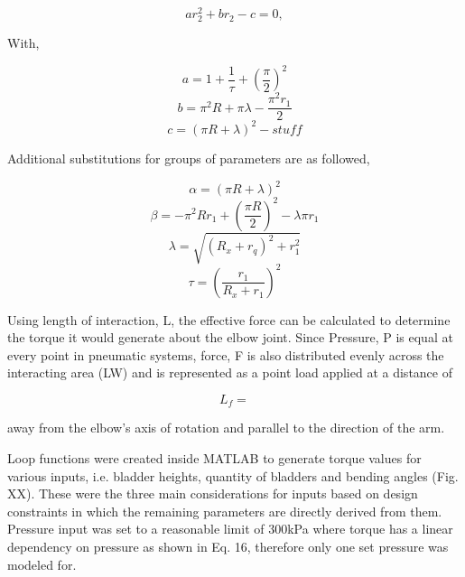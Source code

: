 \documentclass[letterpaper, 10 pt, conference]{ieeeconf}  %
\begin{document}
\begin{equation}\label{eq. X7}
	ar_2^2+br_2-c = 0,
\end{equation}

With,

\begin{equation}\label{eq. X8}
	a = 1+\frac{1}{\tau}+(\frac{\pi}{2})^2
\end{equation}
\begin{equation}\label{eq. X9}
	b = \pi^2R+\pi\lambda-\frac{\pi^2r_1}{2}
\end{equation}
\begin{equation}\label{eq. X10}
	c = (\pi R+\lambda)^2- stuff
\end{equation}

Additional substitutions for groups of parameters are as followed,

\begin{equation}\label{eq. X11}
	\alpha = (\pi R+\lambda)^2
\end{equation}
\begin{equation}\label{eq. X12}
	\beta = -\pi^2Rr_1+(\frac{\pi R}{2})^2-\lambda\pi r_1
\end{equation}
\begin{equation}\label{eq. X13}
	\lambda = \sqrt{(R_x+r_q)^2+r_1^2}
\end{equation}
\begin{equation}\label{eq. X14}
	\tau = (\frac{r_1}{R_x+r_1})^2
\end{equation}

Using length of interaction, L, the effective force can be calculated to determine the torque it would generate about the elbow joint. Since Pressure, P is equal at every point in pneumatic systems, force, F is also distributed evenly across the interacting area (LW) and is represented as a point load applied at a distance of 

\begin{equation}
	L_f = 
\end{equation}

away from the elbow’s axis of rotation and parallel to the direction of the arm. 

Loop functions were created inside MATLAB to generate torque values for various inputs, i.e. bladder heights, quantity of bladders and bending angles (Fig. XX). These were the three main considerations for inputs based on design constraints in which the remaining parameters are directly derived from them. Pressure input was set to a reasonable limit of 300kPa where torque has a linear dependency on pressure as shown in Eq. 16, therefore only one set pressure was modeled for. 
\end{document}
